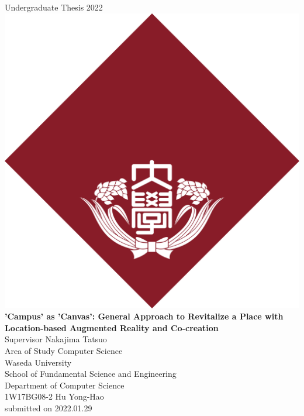 \documentclass[a4paper, 12pt, oneside]{book}
\begin{document}

\begin{titlepage}
\begin{center}
    \vspace{0.1\textheight}
    {\Large Undergraduate Thesis 2022} \\
    \vspace{0.05\textheight}
    \includegraphics[width=48truemm]{resources/0_title/waseda_logo.png} \\
    \vspace{0.05\textheight}
    \textbf{\huge 'Campus' as 'Canvas': General Approach to Revitalize a Place with Location-based Augmented Reality and Co-creation
    } \\
    \vfill
    {\Large Supervisor \hspace{0.02\textwidth} Nakajima Tatsuo} \\
    {\Large Area of Study \hspace{0.02\textwidth} Computer Science} \\
    \vspace{0.05\textheight}
    {\Large 
        Waseda University \\
        School of Fundamental Science and Engineering \\
        Department of Computer Science \\}
    \vspace{0.05\textheight}
    {\Large 1W17BG08-2 Hu Yong-Hao \\}
    \vspace{0.05\textheight}
    {submitted on 2022.01.29}
\end{center}
\end{titlepage}
\end{document}
